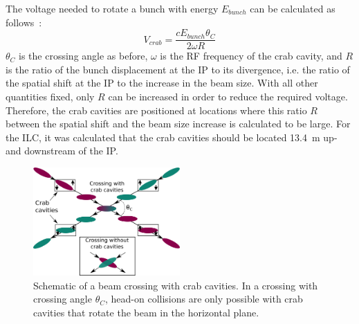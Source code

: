 The voltage needed to rotate a bunch with energy $E_{bunch}$ can be calculated as follows~\cite{Crab_cavities}:
\begin{equation}
 V_{crab}=\frac{cE_{bunch}\theta_C}{2\omega R}
\end{equation}
$\theta_C$ is the crossing angle as before, $\omega$ is the RF frequency of the crab cavity, and $R$ is the ratio of the bunch displacement at the IP to its divergence, i.e. the ratio of the spatial shift at the IP to the increase in the beam size.
With all other quantities fixed, only $R$ can be increased in order to reduce the required voltage.
Therefore, the crab cavities are positioned at locations where this ratio $R$ between the spatial shift and the beam size increase is calculated to be large.
For the ILC, it was calculated that the crab cavities should be located \SI{13.4}{\meter} up- and downstream of the IP.~\cite[p. 154]{TDR32}
\begin{figure}
\centering
\includegraphics[width=0.5\textwidth]{Figures/Crab_crossing.png}
\caption[Schematic of a beam crossing with crab cavities]{Schematic of a beam crossing with crab cavities. In a crossing with crossing angle $\theta_C$, head-on collisions are only possible with crab cavities that rotate the beam in the horizontal plane.}
\label{fig:Crab_crossing}
\end{figure}

